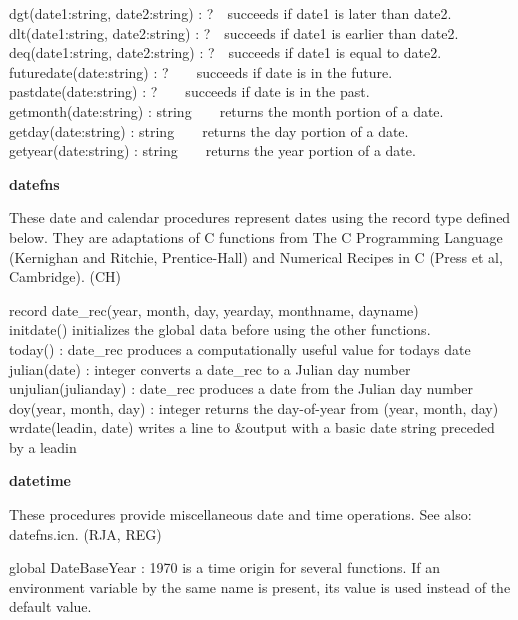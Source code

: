 dgt(date1:string, date2:string) : ?\ \ succeeds if date1 is later than
date2.\\
dlt(date1:string, date2:string) : ?\ \ succeeds if date1 is earlier than
date2.\\
deq(date1:string, date2:string) : ?\ \ succeeds if date1 is equal to
date2.\\
futuredate(date:string) : ?\ \ \ \ succeeds if date is in the
future.\\
pastdate(date:string) : ?\ \ \ \ succeeds if date is in the
past.\\
getmonth(date:string) : string\ \ \ \ returns the month portion of a
date.\\
getday(date:string) : string\ \ \ \ returns the day portion of a
date.\\
getyear(date:string) : string\ \ \ \ returns the year portion of a date.

{\sffamily\bfseries
datefns}

These date and calendar procedures represent dates using the record type
defined below. They are adaptations of C functions from
{\textquotedbl}The C Programming Language{\textquotedbl} (Kernighan and
Ritchie, Prentice-Hall) and {\textquotedbl}Numerical Recipes in
C{\textquotedbl} (Press et al, Cambridge). (CH)

\textsf{record date\_rec(year, month, day, yearday, monthname,
dayname)}\\
\textsf{initdate()} initializes the global data before using the other
functions.\\
\textsf{today() : date\_rec} produces a computationally useful value for
today{\textquotesingle}s date\\
\textsf{julian}\textsf{(date) : integer} converts a
date\_rec to a Julian day number\\
\textsf{unjulian(julianday) : date\_rec} produces a date from the Julian
day number\\
\textsf{doy(year, month, day) : integer} returns the day-of-year from
(year, month, day)\\
\textsf{wrdate(leadin, date)} writes a line to \textsf{\&output} with a
basic date string preceded by a leadin 

{\sffamily\bfseries
datetime}

These procedures provide miscellaneous date and time operations. See
also: \textsf{datefns.icn}. (RJA, REG)

\textsf{global DateBaseYear : 1970} is a time origin for several
functions. If an environment
variable by the same name is present, its value is used instead of the
default value.

